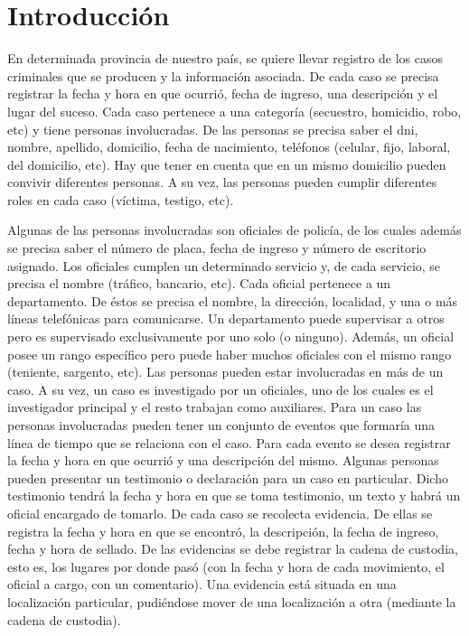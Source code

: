 \documentclass[11pt, a4paper]{article}
\begin{document}

\maketitle
\newpage

\tableofcontents
\newpage

\section{Introducción}
\par En determinada provincia de nuestro país, se quiere llevar registro de los casos criminales que se producen y la información asociada. De cada caso se precisa registrar la fecha y hora en que ocurrió, fecha de ingreso, una descripción y el lugar del suceso. Cada caso pertenece a una categoría (secuestro, homicidio, robo, etc) y tiene personas involucradas. De las personas se precisa saber el dni, nombre, apellido, domicilio, fecha de nacimiento, teléfonos (celular, fijo, laboral, del domicilio, etc). Hay que tener en cuenta que en un mismo domicilio pueden convivir diferentes personas. A su vez, las personas pueden cumplir diferentes roles en cada caso (víctima, testigo, etc).
\par Algunas de las personas involucradas son oficiales de policía, de los cuales además se precisa saber el número de placa, fecha de ingreso y número de escritorio asignado. Los oficiales cumplen un determinado servicio y, de cada servicio, se precisa el nombre (tráfico, bancario, etc). Cada oficial pertenece a un departamento. De éstos se precisa el nombre, la dirección, localidad, y una o más líneas telefónicas para comunicarse. Un departamento puede supervisar a otros pero es supervisado exclusivamente por uno solo (o ninguno). Además, un oficial posee un rango específico pero puede haber muchos oficiales con el mismo rango (teniente, sargento, etc). Las personas pueden estar involucradas en más de un caso. A su vez, un caso es investigado por un oficiales, uno de los cuales es el investigador principal y el resto trabajan como auxiliares. Para un caso las personas involucradas pueden tener un conjunto de eventos que formaría una línea de tiempo que se relaciona con el caso. Para cada evento se desea registrar la fecha y hora en que ocurrió y una descripción del mismo. Algunas personas pueden presentar un testimonio o declaración para un caso en particular. Dicho testimonio tendrá la fecha y hora en que se toma testimonio, un texto y habrá un oficial encargado de tomarlo. De cada caso se recolecta evidencia. De ellas se registra la fecha y hora en que se encontró, la descripción, la fecha de ingreso, fecha y hora de sellado. De las evidencias se debe registrar la cadena de custodia, esto es, los lugares por donde pasó (con la fecha y hora de cada movimiento, el oficial a cargo, con un comentario). Una evidencia está situada en una localización particular, pudiéndose mover de una localización a otra (mediante la cadena de custodia).
\end{document}
